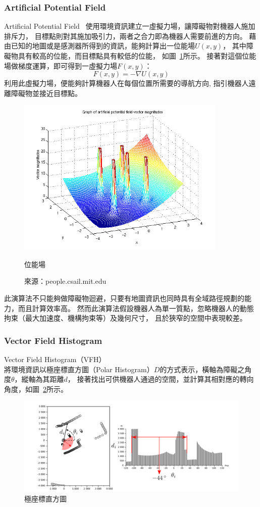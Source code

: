 \subsubsection{Artificial Potential Field}
Artificial Potential Field~\cite{Khatib:1985:APF}
使用環境資訊建立一虛擬力場，讓障礙物對機器人施加排斥力，
目標點則對其施加吸引力，兩者之合力即為機器人需要前進的方向。
藉由已知的地圖或是感測器所得到的資訊，能夠計算出一位能場$U(x,y)$，
其中障礙物具有較高的位能，而目標點具有較低的位能，
如圖~\ref{f:potential_field}所示。
接著對這個位能場做梯度運算，即可得到一虛擬力場$F(x,y)$：
\begin{equation}
	F(x,y) = -\nabla U(x,y)
\end{equation}
利用此虛擬力場，便能夠計算機器人在每個位置所需要的導航方向, 
指引機器人遠離障礙物並接近目標點。
\begin{figure}[h!]
	\centering
	\includegraphics[width=10cm]{figures/algorithm/demo_apf_whitebg}
	\caption{位能場}
	\caption*{來源：people.csail.mit.edu}
	\label{f:potential_field}
\end{figure}

此演算法不只能夠做障礙物迴避，只要有地圖資訊也同時具有全域路徑規劃的能力，而且計算效率高。
然而此演算法假設機器人為單一質點，忽略機器人的動態拘束（最大加速度、機構拘束等）及幾何尺寸，
且於狹窄的空間中表現較差。

\subsubsection{Vector Field Histogram}
Vector Field Histogram（VFH）~\cite{Borenstein:1991:VFH}
將環境資訊以極座標直方圖（Polar Histogram）$D$的方式表示，橫軸為障礙之角度$\theta$，縱軸為其距離$d$，
接著找出可供機器人通過的空間，並計算其相對應的轉向角度，如圖~\ref{f:vfh}所示。
\begin{figure}[h!]
	\centering
	\includegraphics[width=\textwidth]{figures/algorithm/VFHTotal.png}
	\caption{極座標直方圖}
	\label{f:vfh}
\end{figure}

